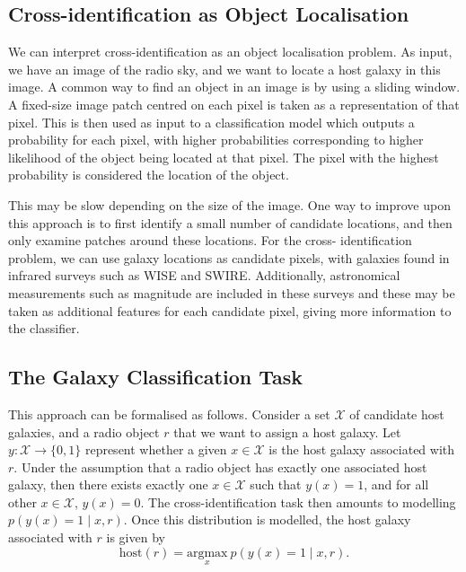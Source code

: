   \subsection{Cross-identification as Object Localisation}
  \label{sec:object-localisation}

    We can interpret cross-identification as an object localisation problem. As
    input, we have an image of the radio sky, and we want to locate a host
    galaxy in this image. A common way to find an object in an image is by using
    a sliding window. A fixed-size image patch centred on each pixel is taken as
    a representation of that pixel. This is then used as input to a
    classification model which outputs a probability for each pixel, with higher
    probabilities corresponding to higher likelihood of the object being located
    at that pixel. The pixel with the highest probability is considered the
    location of the object.

    This may be slow depending on the size of the image. One way to improve upon
    this approach is to first identify a small number of candidate locations,
    and then only examine patches around these locations. For the cross-%
    identification problem, we can use galaxy locations as candidate pixels,
    with galaxies found in infrared surveys such as WISE and SWIRE.
    Additionally, astronomical measurements such as magnitude are included in
    these surveys and these may be taken as additional features for each
    candidate pixel, giving more information to the classifier.

  \subsection{The Galaxy Classification Task}
  \label{sec:galaxy-classification-task}


  This approach can be formalised as follows. Consider a set $\mathcal X$ of
  candidate host galaxies, and a radio object $r$ that we want to assign a
  host galaxy. Let $y : \mathcal X \to \{0, 1\}$ represent whether a given $x
  \in \mathcal X$ is the host galaxy associated with $r$. Under the assumption
  that a radio object has exactly one associated host galaxy, then there exists
  exactly one $x \in \mathcal X$ such that $y(x) = 1$, and for all other $x \in
  \mathcal X$, $y(x) = 0$. The cross-identification task then amounts to
  modelling $p(y(x) = 1 \mid x, r)$. Once this distribution is modelled, the
  host galaxy associated with $r$ is given by
  \begin{equation}
      \label{eq:cross-identification}
      \mbox{host}(r) = \underset{x}{\mbox{argmax}}\ p(y(x) = 1 \mid x, r).
  \end{equation}

